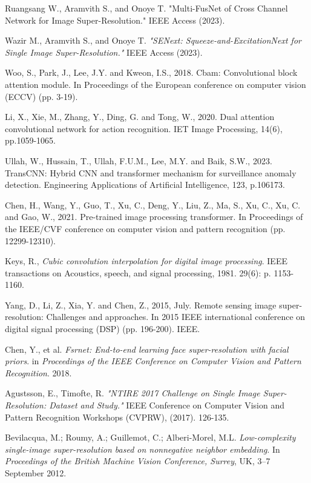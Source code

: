 \documentclass{ieeeaccess}
\begin{document}
\begin{thebibliography}{00}
 Ruangsang W., Aramvith S., and Onoye T. "Multi-FusNet of Cross Channel Network for Image Super-Resolution." IEEE Access (2023).

 Wazir M., Aramvith S., and Onoye T. \textit{"SENext: Squeeze-and-ExcitationNext for Single Image Super-Resolution." }IEEE Access (2023).

 Woo, S., Park, J., Lee, J.Y. and Kweon, I.S., 2018. Cbam: Convolutional block attention module. In Proceedings of the European conference on computer vision (ECCV) (pp. 3-19).

 Li, X., Xie, M., Zhang, Y., Ding, G. and Tong, W., 2020. Dual attention convolutional network for action recognition. IET Image Processing, 14(6), pp.1059-1065.

 Ullah, W., Hussain, T., Ullah, F.U.M., Lee, M.Y. and Baik, S.W., 2023. TransCNN: Hybrid CNN and transformer mechanism for surveillance anomaly detection. Engineering Applications of Artificial Intelligence, 123, p.106173.

 Chen, H., Wang, Y., Guo, T., Xu, C., Deng, Y., Liu, Z., Ma, S., Xu, C., Xu, C. and Gao, W., 2021. Pre-trained image processing transformer. In Proceedings of the IEEE/CVF conference on computer vision and pattern recognition (pp. 12299-12310).

 Keys, R., \textit{Cubic convolution interpolation for digital image processing}. IEEE transactions on Acoustics, speech, and signal processing, 1981. 29(6): p. 1153-1160.

 Yang, D., Li, Z., Xia, Y. and Chen, Z., 2015, July. Remote sensing image super-resolution: Challenges and approaches. In 2015 IEEE international conference on digital signal processing (DSP) (pp. 196-200). IEEE.

 Chen, Y., et al. \textit{Fsrnet: End-to-end learning face super-resolution with facial priors}. in \textit{Proceedings of the IEEE Conference on Computer Vision and Pattern Recognition}. 2018.

 Agustsson, E.,  Timofte, R. \textit{"NTIRE 2017 Challenge on Single Image Super-Resolution: Dataset and Study."} IEEE Conference on Computer Vision and Pattern Recognition Workshops (CVPRW), (2017). 126-135.

 Bevilacqua, M.; Roumy, A.; Guillemot, C.; Alberi-Morel, M.L. \textit{Low-complexity single-image super-resolution based on nonnegative neighbor embedding}. In \textit{Proceedings of the British Machine Vision Conference, Surrey}, UK, 3–7 September 2012.


\end{thebibliography}
\end{document}
